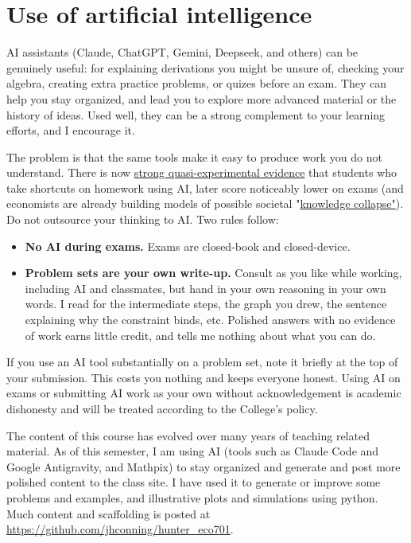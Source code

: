 \documentclass[11pt]{article}
\begin{document}
\newpage

\section{Use of artificial intelligence}
AI assistants (Claude, ChatGPT, Gemini, Deepseek, and others) can be genuinely
useful: for explaining derivations you might be unsure of, checking your algebra, creating extra practice problems, or quizes before an exam. They can help you stay organized, and lead you to explore more advanced material or the history of ideas. Used well, they can be a strong complement to your learning efforts, and I encourage it.  

The problem is that the same tools make it easy to produce work you do not understand. There is now \href{https://www.economist.com/graphic-detail/2026/08/18/does-ai-stop-children-from-learning}{strong quasi-experimental evidence} that students who take shortcuts on homework using AI, later score noticeably lower on exams  (and economists are already building models of possible societal "\href{https://www.nber.org/papers/w34910}{knowledge collapse"}). Do not outsource your thinking to AI. Two rules follow:

\begin{itemize}
\item \textbf{No AI during exams.} Exams are closed-book and closed-device.
\item \textbf{Problem sets are your own write-up.} Consult as you like while
working, including AI and classmates, but hand in your own
reasoning in your own words. I read for the intermediate steps, the graph you
drew, the sentence explaining why the constraint binds, etc. Polished answers with no evidence of work earns little credit, and tells me nothing about what you can do.
\end{itemize}

If you use an AI tool substantially on a problem set, note it briefly at the top of your submission. This costs you nothing and keeps everyone honest.  Using AI on exams or submitting AI work as your own without acknowledgement is academic dishonesty and will be treated according to the College's policy. 

The content of this course has evolved over many years of teaching related material.  As of this semester, I am using AI (tools such as Claude Code and Google Antigravity, and Mathpix) to stay organized and generate and post more polished content to the class site. I have used it to generate or improve some problems and examples, and illustrative plots and simulations using python. Much content and scaffolding is posted at \href{https://github.com/jhconning/hunter_eco701}{https://github.com/jhconning/hunter\_eco701}.
\end{document}
